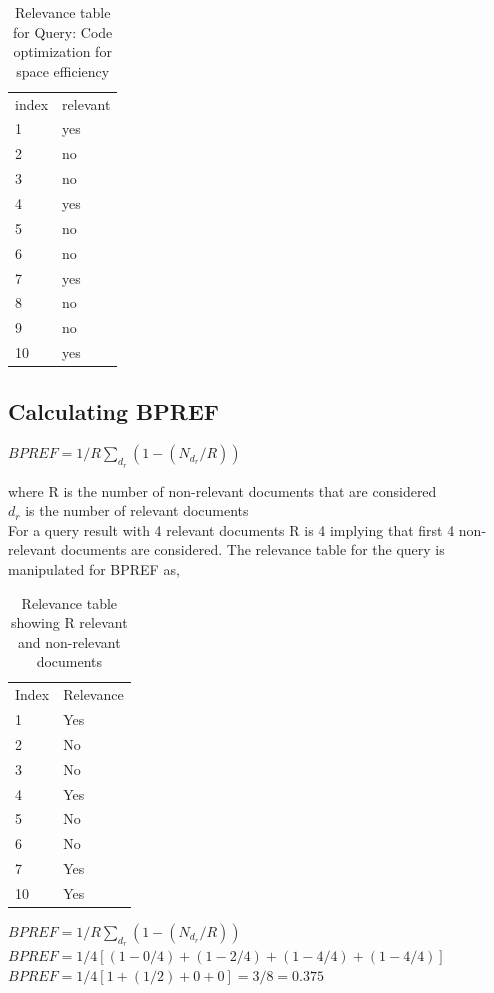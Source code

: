 \documentclass[12pt]{report}
\begin{document}
\begin{table}[]
\centering
\caption{Relevance table for Query: Code optimization for space efficiency}
\label{my-label}
\begin{tabular}{ll}
index & relevant \\
1     & yes      \\
2     & no       \\
3     & no       \\
4     & yes      \\
5     & no       \\
6     & no       \\
7     & yes      \\
8     & no       \\
9     & no       \\
10    & yes     
\end{tabular}
\end{table}

\subsection{Calculating BPREF}

$BPREF = 1/R \sum\limits_{d_r}^{}(1- ({N_{d_r}} / R))$

where R is the number of non-relevant documents that are considered\\
$d_r$ is the number of relevant documents\\
 
For a query result with 4 relevant documents R is 4 implying that first 4 non-relevant documents are considered. The relevance table for the query is manipulated for BPREF as,\\

\begin{table}[]
\centering
\caption{Relevance table showing R relevant and non-relevant documents}
\label{my-label}
\begin{tabular}{ll}
Index & Relevance \\
1     & Yes       \\
2     & No        \\
3     & No        \\
4     & Yes       \\
5     & No        \\
6     & No        \\
7     & Yes       \\
10    & Yes      
\end{tabular}
\end{table}
$BPREF = 1/R \sum\limits_{d_r}^{}(1- ({N_{d_r}} / R))$\\
$BPREF = 1/4[(1-0/4) + (1 - 2/4) + (1- 4/4) + (1- 4/4)]$\\
$BPREF = 1/4 [1 + (1/2) + 0 + 0] = 3/8 = 0.375$
\end{document}
